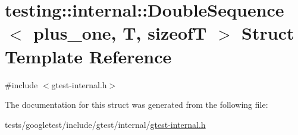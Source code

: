 \hypertarget{structtesting_1_1internal_1_1DoubleSequence}{}\section{testing\+:\+:internal\+:\+:Double\+Sequence$<$ plus\+\_\+one, T, sizeofT $>$ Struct Template Reference}
\label{structtesting_1_1internal_1_1DoubleSequence}


{\ttfamily \#include $<$gtest-\/internal.\+h$>$}



The documentation for this struct was generated from the following file\+:\begin{DoxyCompactItemize}
\item 
tests/googletest/include/gtest/internal/\hyperlink{gtest-internal_8h}{gtest-\/internal.\+h}\end{DoxyCompactItemize}
